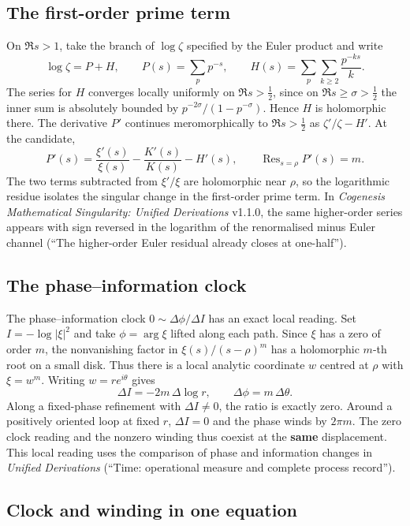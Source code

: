 \documentclass[11pt]{article}
\begin{document}
\subsection{The first-order prime term}

On \(\Re s>1\), take the branch of \(\log\zeta\) specified by the Euler product and write
\[
\log\zeta=P+H,\qquad
P(s)=\sum_p p^{-s},\qquad
H(s)=\sum_p\sum_{k\ge2}\frac{p^{-ks}}{k}.
\]
The series for \(H\) converges locally uniformly on \(\Re s>\tfrac12\), since on \(\Re s\ge\sigma>\tfrac12\) the inner sum is absolutely bounded by \(p^{-2\sigma}/(1-p^{-\sigma})\). Hence \(H\) is holomorphic there. The derivative \(P'\) continues meromorphically to \(\Re s>\tfrac12\) as \(\zeta'/\zeta-H'\). At the candidate,
\[
P'(s)=\frac{\xi'(s)}{\xi(s)}-\frac{K'(s)}{K(s)}-H'(s),
\qquad
\boxed{\operatorname{Res}_{s=\rho}P'(s)=m.}
\]
The two terms subtracted from \(\xi'/\xi\) are holomorphic near \(\rho\), so the logarithmic residue isolates the singular change in the first-order prime term. In \emph{Cogenesis Mathematical Singularity: Unified Derivations} v1.1.0, the same higher-order series appears with sign reversed in the logarithm of the renormalised minus Euler channel (``The higher-order Euler residual already closes at one-half'').

\subsection{The phase--information clock}

The phase--information clock \(0\sim\Delta\phi/\Delta I\) has an exact local reading. Set \(I=-\log|\xi|^2\) and take \(\phi=\arg\xi\) lifted along each path. Since \(\xi\) has a zero of order \(m\), the nonvanishing factor in \(\xi(s)/(s-\rho)^m\) has a holomorphic \(m\)-th root on a small disk. Thus there is a local analytic coordinate \(w\) centred at \(\rho\) with \(\xi=w^m\). Writing \(w=re^{i\theta}\) gives
\[
\Delta I=-2m\,\Delta\log r,\qquad
\Delta\phi=m\,\Delta\theta.
\]
Along a fixed-phase refinement with \(\Delta I\ne0\), the ratio is exactly zero. Around a positively oriented loop at fixed \(r\), \(\Delta I=0\) and the phase winds by \(2\pi m\). The zero clock reading and the nonzero winding thus coexist at the \textbf{same} displacement. This local reading uses the comparison of phase and information changes in \emph{Unified Derivations} (``Time: operational measure and complete process record'').

\subsection{Clock and winding in one equation}
\end{document}
